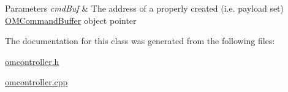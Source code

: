 \begin{DoxyParams}{Parameters}
{\em cmdBuf} & The address of a properly created (i.e. payload set) \hyperlink{class_o_m_command_buffer}{OMCommandBuffer} object pointer \\
\hline
\end{DoxyParams}


The documentation for this class was generated from the following files:\begin{DoxyCompactItemize}
\item 
\hyperlink{omcontroller_8h}{omcontroller.h}\item 
\hyperlink{omcontroller_8cpp}{omcontroller.cpp}\end{DoxyCompactItemize}
